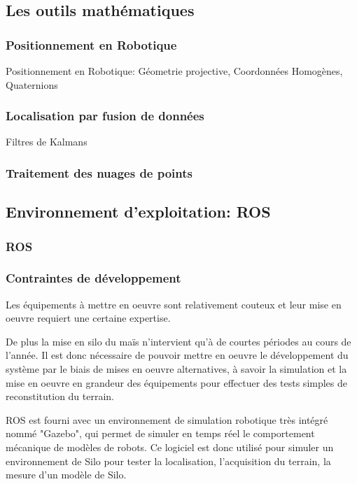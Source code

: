 \documentclass[12pt,a4paper]{report}
\begin{document}
		\subsection{Les outils mathématiques}
			\subsubsection{Positionnement en Robotique}
		Positionnement en Robotique: Géometrie projective, Coordonnées Homogènes, Quaternions
			
			\subsubsection{Localisation par fusion de données}
		Filtres de Kalmans
		
			\subsubsection{Traitement des nuages de points}
			
		\subsection{Environnement d'exploitation: ROS}
			\subsubsection{ROS}
			
			\subsubsection{Contraintes de développement}
				Les équipements à mettre en oeuvre sont relativement couteux et leur mise en oeuvre requiert une certaine expertise.
				
				De plus la mise en silo du maïs n'intervient qu'à de courtes périodes au cours de l'année. Il est donc nécessaire de pouvoir mettre en oeuvre le développement du système par le biais de mises en oeuvre alternatives, à savoir la simulation et la mise en oeuvre en grandeur des équipements pour effectuer des tests simples de reconstitution du terrain.
				
				ROS est fourni avec un environnement de simulation robotique très intégré nommé "Gazebo", qui permet de simuler en temps réel le comportement mécanique de modèles de robots. Ce logiciel est donc utilisé pour simuler un environnement de Silo pour tester la localisation, l'acquisition du terrain, la mesure d'un modèle de Silo.
				
\end{document}
